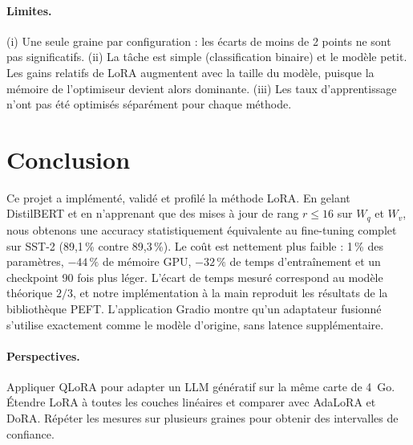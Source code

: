 \paragraph{Limites.} (i) Une seule graine par configuration : les écarts de moins de 2 points ne sont pas significatifs. (ii) La tâche est simple (classification binaire) et le modèle petit. Les gains relatifs de LoRA augmentent avec la taille du modèle, puisque la mémoire de l'optimiseur devient alors dominante. (iii) Les taux d'apprentissage n'ont pas été optimisés séparément pour chaque méthode.

\section{Conclusion}
Ce projet a implémenté, validé et profilé la méthode LoRA. En gelant DistilBERT et en n'apprenant que des mises à jour de rang $r\le16$ sur $W_q$ et $W_v$, nous obtenons une accuracy statistiquement équivalente au fine-tuning complet sur SST-2 (89,1\,\% contre 89,3\,\%). Le coût est nettement plus faible : 1\,\% des paramètres, $-44\,\%$ de mémoire GPU, $-32\,\%$ de temps d'entraînement et un checkpoint 90 fois plus léger. L'écart de temps mesuré correspond au modèle théorique $2/3$, et notre implémentation à la main reproduit les résultats de la bibliothèque PEFT. L'application Gradio montre qu'un adaptateur fusionné s'utilise exactement comme le modèle d'origine, sans latence supplémentaire.

\paragraph{Perspectives.} Appliquer QLoRA \cite{dettmers2023qlora} pour adapter un LLM génératif sur la même carte de 4~Go. Étendre LoRA à toutes les couches linéaires et comparer avec AdaLoRA et DoRA. Répéter les mesures sur plusieurs graines pour obtenir des intervalles de confiance.
